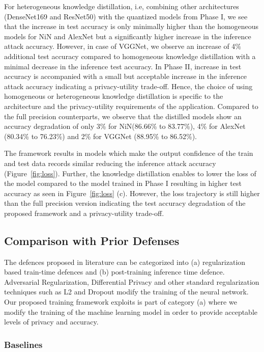 For heterogeneous knowledge distillation, i.e, combining other architectures (DenseNet169 and ResNet50) with the quantized models from Phase I, we see that the increase in test accuracy is only minimally higher than the homogeneous models for NiN and AlexNet but a significantly higher increase in the inference attack accuracy.
However, in case of VGGNet, we observe an increase of 4\% additional test accuracy compared to homogeneous knowledge distillation with a minimal decrease in the inference test accuracy.
In Phase II, increase in test accuracy is accompanied with a small but acceptable increase in the inference attack accuracy indicating a privacy-utility trade-off.
Hence, the choice of using homogeneous or heterogeneous knowledge distillation is specific to the architecture and the privacy-utility requirements of the application.
Compared to the full precision counterparts, we observe that the distilled models show an accuracy degradation of only 3\% for NiN(86.66\% to 83.77\%), 4\% for AlexNet (80.34\% to 76.23\%) and 2\% for VGGNet (88.95\% to 86.52\%).

The \method\hspace{0.02in} framework results in models which make the output confidence of the train and test data records similar reducing the inference attack accuracy (Figure~\ref{fig:loss}).
Further, the knowledge distillation enables to lower the loss of the model compared to the model trained in Phase I resulting in higher test accuracy as seen in Figure~\ref{fig:loss} (c).
However, the loss trajectory is still higher than the full precision version indicating the test accuracy degradation of the proposed framework and a privacy-utility trade-off.

\subsection{Comparison with Prior Defenses}

The defences proposed in literature can be categorized into (a) regularization based train-time defences and (b) post-training inference time defence.
Adversarial Regularization, Differential Privacy and other standard regularization techniques such as L2 and Dropout modify the training of the neural network.
Our proposed training framework exploits is part of category (a) where we modify the training of the machine learning model in order to provide acceptable levels of privacy and accuracy.

\subsubsection{Baselines}

